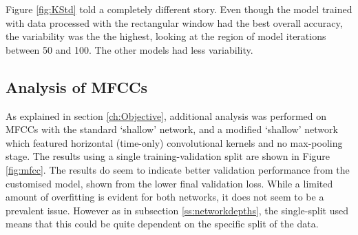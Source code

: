 \documentclass[class=report,11pt,crop=false]{standalone}
\begin{document}
Figure \ref{fig:KStd} told a completely different story. Even though the model trained with data processed with the rectangular window had the best overall accuracy, the variability was the the highest, looking at the region of model iterations between 50 and 100. The other models had less variability. 


\subsection{Analysis of MFCCs}

As explained in section \ref{ch:Objective}, additional analysis was performed on MFCCs with the standard `shallow' network, and a modified `shallow' network which featured horizontal (time-only) convolutional kernels and no max-pooling stage. The results using a single training-validation split are shown in Figure \ref{fig:mfcc}. The results do seem to indicate better validation performance from the customised model, shown from the lower final validation loss. While a limited amount of overfitting is evident for both networks, it does not seem to be a prevalent issue. However as in subsection \ref{ss:networkdepths}, the single-split used means that this could be quite dependent on the specific split of the data.
\end{document}
